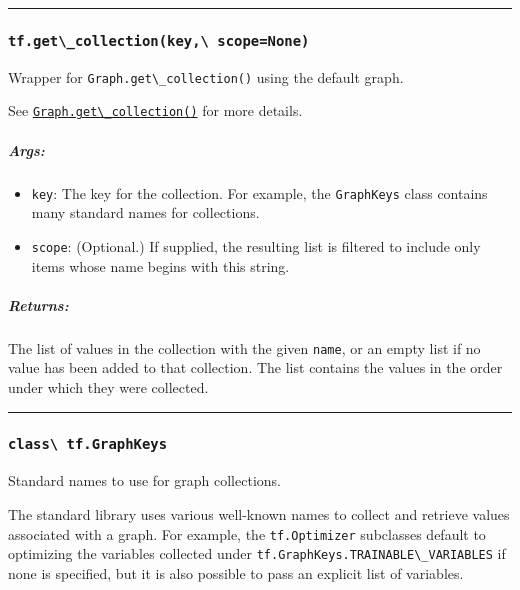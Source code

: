 \begin{center}\rule{0.5\linewidth}{\linethickness}\end{center}

\subsubsection{\texorpdfstring{\lstinline{tf.get\_collection(key,\ scope=None)}
}{tf.get\_collection(key, scope=None) }}\label{tf.getux5fcollectionkey-scopenone}

Wrapper for \lstinline{Graph.get\_collection()} using the default graph.

See
\href{../../api_docs/python/framework.md\#Graph.get_collection}{\lstinline{Graph.get\_collection()}}
for more details.

\subparagraph{Args: }\label{args-27}

\begin{itemize}
\tightlist
\item
  \lstinline{key}: The key for the collection. For example, the
  \lstinline{GraphKeys} class contains many standard names for collections.
\item
  \lstinline{scope}: (Optional.) If supplied, the resulting list is
  filtered to include only items whose name begins with this string.
\end{itemize}

\subparagraph{Returns: }\label{returns-30}

The list of values in the collection with the given \lstinline{name}, or an
empty list if no value has been added to that collection. The list
contains the values in the order under which they were collected.

\begin{center}\rule{0.5\linewidth}{\linethickness}\end{center}

\subsubsection{\texorpdfstring{\lstinline{class\ tf.GraphKeys}
}{class tf.GraphKeys }}\label{class-tf.graphkeys}

Standard names to use for graph collections.

The standard library uses various well-known names to collect and
retrieve values associated with a graph. For example, the
\lstinline{tf.Optimizer} subclasses default to optimizing the variables
collected under \lstinline{tf.GraphKeys.TRAINABLE\_VARIABLES} if none is
specified, but it is also possible to pass an explicit list of
variables.

